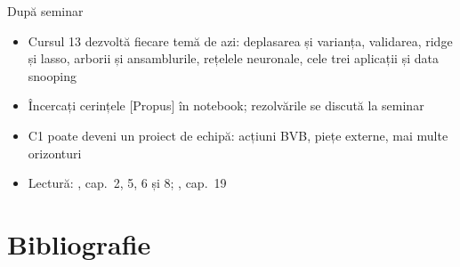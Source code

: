 \begin{frame}{După seminar}
\itemsize{\small}
\begin{itemize}
    \item Cursul 13 dezvoltă fiecare temă de azi: deplasarea și varianța, validarea, ridge și lasso, arborii și ansamblurile, rețelele neuronale, cele trei aplicații și data snooping
    \item Încercați cerințele [Propus] în notebook; rezolvările se discută la seminar
    \item C1 poate deveni un proiect de echipă: acțiuni BVB, piețe externe, mai multe orizonturi
    \item Lectură: , cap.~2, 5, 6 și 8; , cap.~19
\end{itemize}
\end{frame}


\section{Bibliografie}

